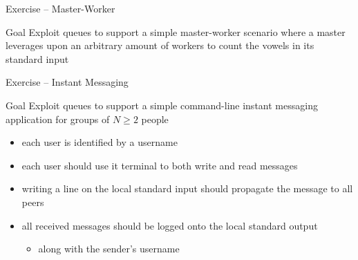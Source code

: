 \documentclass{beamer}\mode<presentation>{\usetheme{AMSBolognaFC}}
\begin{document}
\startExercise

\begin{frame}{Exercise \currentExercise{} -- Master-Worker}
    \begin{block}{Goal}
        Exploit queues to support a simple master-worker scenario where a master leverages upon an arbitrary amount of workers to count the vowels in its standard input
    \end{block}
\end{frame}

\startExercise

\begin{frame}{Exercise \currentExercise{} -- Instant Messaging}
    \begin{block}{Goal}
        Exploit queues to support a simple command-line instant messaging application for groups of $N \geq 2$ people
        \begin{itemize}
            \item each user is identified by a username
            \item each user should use it terminal to both write and read messages
            \item writing a line on the local standard input should propagate the message to all peers
            \item all received messages should be logged onto the local standard output
            \begin{itemize}
                \item along with the sender's username
            \end{itemize}
        \end{itemize}
    \end{block}
\end{frame}

\section*{}
\frame{\titlepage}

\end{document}
